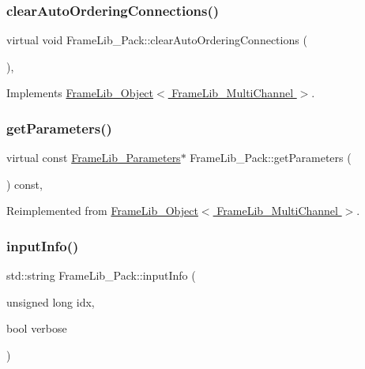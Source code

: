 \subsubsection{\texorpdfstring{clear\+Auto\+Ordering\+Connections()}{clearAutoOrderingConnections()}}
{\footnotesize\ttfamily virtual void Frame\+Lib\+\_\+\+Pack\+::clear\+Auto\+Ordering\+Connections (\begin{DoxyParamCaption}{ }\end{DoxyParamCaption})\hspace{0.3cm}{\ttfamily [inline]}, {\ttfamily [virtual]}}



Implements \hyperlink{class_frame_lib___object_aac43ebfacb59081f7f60957380df7481}{Frame\+Lib\+\_\+\+Object$<$ Frame\+Lib\+\_\+\+Multi\+Channel $>$}.

\mbox{\label{class_frame_lib___pack_af3f27c6065dc2e5c8106de50c42d63c3}} 
\subsubsection{\texorpdfstring{get\+Parameters()}{getParameters()}}
{\footnotesize\ttfamily virtual const \hyperlink{class_frame_lib___parameters}{Frame\+Lib\+\_\+\+Parameters}$\ast$ Frame\+Lib\+\_\+\+Pack\+::get\+Parameters (\begin{DoxyParamCaption}{ }\end{DoxyParamCaption}) const\hspace{0.3cm}{\ttfamily [inline]}, {\ttfamily [virtual]}}



Reimplemented from \hyperlink{class_frame_lib___object_ac90a6770aeef26ee1601889dc16dba56}{Frame\+Lib\+\_\+\+Object$<$ Frame\+Lib\+\_\+\+Multi\+Channel $>$}.

\mbox{\label{class_frame_lib___pack_ae9dacf16825332c2227cd9fd9af9db1d}} 
\subsubsection{\texorpdfstring{input\+Info()}{inputInfo()}}
{\footnotesize\ttfamily std\+::string Frame\+Lib\+\_\+\+Pack\+::input\+Info (\begin{DoxyParamCaption}\item[{unsigned long}]{idx,  }\item[{bool}]{verbose }\end{DoxyParamCaption})\hspace{0.3cm}{\ttfamily [virtual]}}



